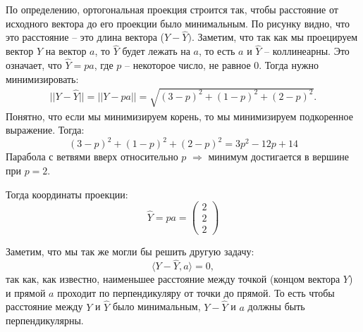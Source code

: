 \documentclass[11pt, a4paper]{extarticle}
\begin{document}
\begin{enumerate}[label=\alph*)]
\begin{center}
		\end{center}
	
		По определению, ортогональная проекция строится так, чтобы расстояние от исходного вектора до его проекции было минимальным. По рисунку видно, что это расстояние – это длина вектора ($Y - \hat{Y})$. Заметим, что так как мы проецируем вектор $Y$ на вектор $a$, то $\hat{Y}$ будет лежать на $a$, то есть $a$ и $\hat{Y}$ – коллинеарны. Это означает, что $\hat{Y} = pa$, где $p$ – некоторое число, не равное 0. Тогда нужно минимизировать:
		\begin{align*}
			||Y - \hat{Y}|| = ||Y - pa|| = \sqrt{(3 - p)^2 + (1 - p)^2 + (2 - p)^2}.
		\end{align*}
		Понятно, что если мы минимизируем корень, то мы минимизируем подкоренное выражение. Тогда:
		\[
		(3 - p)^2 + (1 - p)^2 + (2 - p)^2 = 3p^2 -12p + 14
		\]
		Парабола с ветвями вверх относительно $p$ $\Rightarrow$ минимум достигается в вершине при $p = 2$.
		
		Тогда координаты проекции: 
		\[
		\hat{Y} = pa = \begin{pmatrix}
		2 \\
		2 \\
		2
		\end{pmatrix}
		\] 
		
		Заметим, что мы так же могли бы решить другую задачу:
		\[
		\langle Y - \hat{Y}, a \rangle = 0,
		\]
		так как, как известно, наименьшее расстояние между точкой (концом вектора $Y$) и прямой $a$ проходит по перпендикуляру от точки до прямой. То есть чтобы расстояние между $Y$ и $\hat{Y}$ было минимальным, $Y - \hat{Y}$ и $a$ должны быть перпендикулярны.
		

\end{enumerate}
\end{document}
